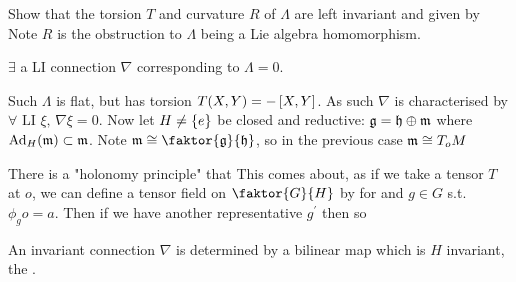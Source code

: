 \documentclass{article}
\begin{document}
\begin{ex}
	Show that the torsion $T$ and curvature $R$ of $\Lambda$ are left invariant and given by 
	Note $R$ is the obstruction to $\Lambda$ being a Lie algebra homomorphism. 
\end{ex}

\begin{claim}
	$\exists$ a LI connection $\nabla$ corresponding to $\Lambda=0$. 
\end{claim} 
Such $\Lambda$ is flat, but has torsion $T(X,Y) = - \comm[X]{Y}$. As such $\nabla$ is characterised by $\forall \text{ LI } \xi , \, \nabla\xi = 0$. Now let $H \neq \pbrace{e}$ be closed and reductive: $\mf{g} = \mf{h} \oplus \mf{m}$ where $\Ad_H(\mf{m}) \subset \mf{m}$. Note $\mf{m}\cong \faktor{\mf{g}}{\mf{h}}$, so in the previous case $\mf{m}\cong T_oM$

\begin{aside}
	There is a "holonomy principle" that 
	This comes about, as if we take a tensor $T$ at $o$, we can define a tensor field on $\faktor{G}{H}$ by 
	for and $g \in G$ s.t. $\phi_g o = a$. Then if we have another representative $g^\prime$ then 
	so 
\end{aside}

\begin{claim}
	An invariant connection $\nabla$ is determined by a bilinear map 
	which is $H$ invariant, the . 
\end{claim}
\end{document}
